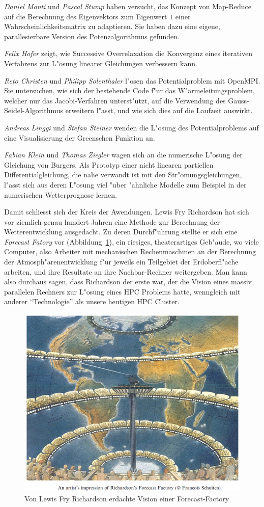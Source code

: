 {\em Daniel Monti} und {\em Pascal Stump} haben versucht, das Konzept
von Map-Reduce auf die Berechnung des Eigenvektors zum Eigenwert $1$
einer Wahrscheinlichkeitsmatrix zu adaptieren. Sie haben dazu eine eigene,
parallesierbare Version des Potenzalgorithmus gefunden.

{\em Felix Hofer} zeigt, wie Successive Overrelaxation die
Konvergenz eines iterativen Verfahrens zur L"osung linearer Gleichungen
verbessern kann.

{\em Reto Christen} und {\em Philipp Solenthaler} l"osen das Potentialproblem
mit OpenMPI. Sie untersuchen, wie sich der bestehende Code f"ur das
W"armeleitungsproblem, welcher nur das Jacobi-Verfahren unterst"utzt,
auf die Verwendung des Gauss-Seidel-Algorithmus erweitern l"asst, und
wie sich dies auf die Laufzeit auswirkt.

{\em Andreas Linggi} und {\em Stefan Steiner} wenden die L"osung des
Potentialproblems auf eine Visualisierung der Greenschen Funktion an.

{\em Fabian Klein} und {\em Thomas Ziegler} wagen sich an die numerische
L"osung der Gleichung von Burgers. Als Prototyp einer nicht linearen
partiellen Differentialgleichung, die nahe verwandt ist mit den
Str"omungsgleichungen, l"asst sich aus deren L"osung viel "uber "ahnliche
Modelle zum Beispiel in der numerischen Wetterprognose lernen.

Damit schliesst sich der Kreis der Awendungen. Lewis Fry Richardson hat
sich vor ziemlich genau hundert Jahren eine Methode zur Berechnung der
Wetterentwicklung ausgedacht. Zu deren Durchf"uhrung stellte er sich
eine {\em Forecast Fatory} vor (Abbildung~\ref{forecastfactory}),
ein riesiges, theaterartiges Geb"aude,
wo viele Computer, also Arbeiter mit mechanischen Rechenmaschinen an der
Berechnung der Atmosph"arenentwicklung f"ur jeweils ein Teilgebiet
der Erdoberfl"ache arbeiten,
und ihre Resultate an ihre Nachbar-Rechner weitergeben. 
Man kann also durchaus sagen, dass Richardson der erste war, der die Vision
eines massiv parallelen Rechners zur L"osung eines HPC Problems hatte,
wenngleich mit anderer ``Technologie'' als unsere heutigen HPC Cluster.

\begin{figure}
\begin{center}
\includegraphics[width=\hsize]{images/forecast-factory-color.jpg}
\end{center}
\caption{Von Lewis Fry Richardson erdachte Vision einer Forecast-Factory
\label{forecastfactory}}
\end{figure}
